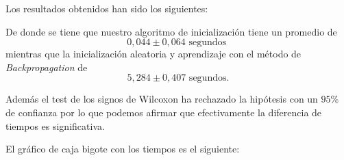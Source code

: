 Los resultados obtenidos han sido los siguientes: 

\begin{table}[H]
    \centering
    \caption{Tiempos en segundos hasta parada empleado por cada algoritmo en las sucesivas iteraciones }
\end{table}



De donde se tiene que nuestro algoritmo de inicialización tiene un promedio de 
\begin{equation}
    0,044 \pm 0,064 \text{ segundos }
\end{equation}
mientras que la inicialización aleatoria y aprendizaje con el método de 
\textit{Backpropagation} de 
\begin{equation}
    5,284 \pm 0,407   \text{ segundos}.
\end{equation}

Además el test de los signos de Wilcoxon ha rechazado la hipótesis 
con un $95\%$ de confianza
por lo que podemos afirmar que efectivamente la diferencia de tiempos es significativa. 

El gráfico de caja bigote con los tiempos es el siguiente: 

